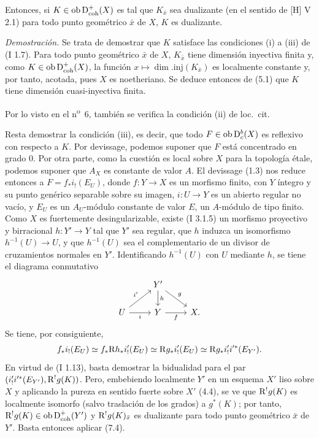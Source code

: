 Entonces, si $K\in\operatorname{ob}\mathrm{D}^{+}_{\mathrm{coh}}(X)$ es tal que $K_{\bar{x}}$ sea dualizante (en el sentido de [H] V 2.1) para todo punto geométrico $\bar{x}$ de $X$, $K$ es dualizante.

\emph{Demostración.} Se trata de demostrar que $K$ satisface las condiciones (i) a (iii) de (I 1.7). Para todo punto geométrico $\bar{x}$ de $X$, $K_{\bar{x}}$ tiene dimensión inyectiva finita y, como $K\in\operatorname{ob}\mathrm{D}^{+}_{\mathrm{coh}}(X)$, la función $x\mapsto \dim.\mathrm{inj}(K_{\bar{x}})$ es localmente constante y, por tanto, acotada, pues $X$ es noetheriano. Se deduce entonces de (5.1) que $K$ tiene dimensión cuasi-inyectiva finita.

Por lo visto en el n\textsuperscript{o}~6, también se verifica la condición (ii) de loc.~cit.

Resta demostrar la condición (iii), es decir, que todo $F\in\operatorname{ob}\mathrm{D}_c^b(X)$ es reflexivo con respecto a $K$. Por devissage, podemos suponer que $F$ está concentrado en grado $0$. Por otra parte, como la cuestión es local sobre $X$ para la topología étale, podemos suponer que $A_X$ es constante de valor $A$. El devissage (1.3) nos reduce entonces a $F=f_*i_!(E_U)$, donde $f:Y\to X$ es un morfismo finito, con $Y$ íntegro y su punto genérico separable sobre su imagen, $i:U\to Y$ es un abierto regular no vacío, y $E_U$ es un $A_U$-módulo constante de valor $E$, un $A$-módulo de tipo finito. Como $X$ es fuertemente desingularizable, existe (I 3.1.5) un morfismo proyectivo y birracional $h:Y'\to Y$ tal que $Y'$ sea regular, que $h$ induzca un isomorfismo $h^{-1}(U)\to U$, y que $h^{-1}(U)$ sea el complementario de un divisor de cruzamientos normales en $Y'$. Identificando $h^{-1}(U)$ con $U$ mediante $h$, se tiene el diagrama conmutativo
\[
\begin{tikzcd}
& Y' \arrow[d,"h"] \arrow[dr,"g"] & \\
U \arrow[ur,"i'"] \arrow[r,"i"'] & Y \arrow[r,"f"'] & X.
\end{tikzcd}
\]
Se tiene, por consiguiente,
\[
        f_*i_!(E_U)\simeq f_*\mathrm{R} h_* i'_!(E_U)\simeq \mathrm{R} g_* i'_!(E_U)\simeq \mathrm{R} g_* i'_! i'^*(E_{Y'}).
\]
En virtud de (I 1.13), basta demostrar la bidualidad para el par $(i'_!i'^*(E_{Y'}),\mathrm{R}^!g(K))$. Pero, embebiendo localmente $Y'$ en un esquema $X'$ liso sobre $X$ y aplicando la pureza en sentido fuerte sobre $X'$ (4.4), se ve que $\mathrm{R}^!g(K)$ es localmente isomorfo (salvo traslación de los grados) a $g^*(K)$; por tanto, $\mathrm{R}^!g(K)\in\operatorname{ob}\mathrm{D}^{+}_{\mathrm{coh}}(Y')$ y $\mathrm{R}^!g(K)_{\bar{x}}$ es dualizante para todo punto geométrico $\bar{x}$ de $Y'$. Basta entonces aplicar (7.4).

